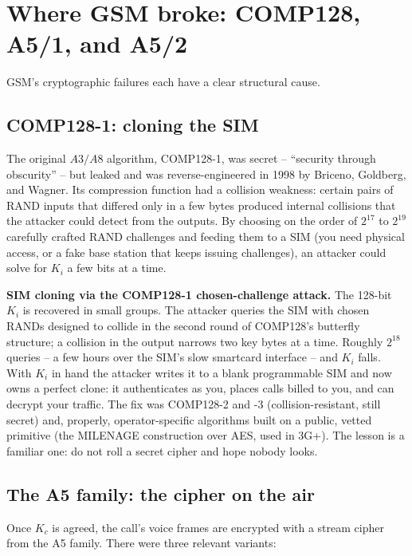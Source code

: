 \section{Where GSM broke: COMP128, A5/1, and A5/2}
\label{ch29:gsm-breaks}

GSM's cryptographic failures each have a clear structural cause.

\subsection{COMP128-1: cloning the SIM}
\label{ch29:comp128}

The original $A3/A8$ algorithm, COMP128-1, was secret -- ``security through obscurity'' -- but leaked and was reverse-engineered in 1998 by Briceno, Goldberg, and Wagner. Its compression function had a collision weakness: certain pairs of RAND inputs that differed only in a few bytes produced internal collisions that the attacker could detect from the outputs. By choosing on the order of $2^{17}$ to $2^{19}$ carefully crafted RAND challenges and feeding them to a SIM (you need physical access, or a fake base station that keeps issuing challenges), an attacker could solve for $K_i$ a few bits at a time.

\begin{attackbox}
\textbf{SIM cloning via the COMP128-1 chosen-challenge attack.} The 128-bit $K_i$ is recovered in small groups. The attacker queries the SIM with chosen RANDs designed to collide in the second round of COMP128's butterfly structure; a collision in the output narrows two key bytes at a time. Roughly $2^{18}$ queries -- a few hours over the SIM's slow smartcard interface -- and $K_i$ falls. With $K_i$ in hand the attacker writes it to a blank programmable SIM and now owns a perfect clone: it authenticates as you, places calls billed to you, and can decrypt your traffic. The fix was COMP128-2 and -3 (collision-resistant, still secret) and, properly, operator-specific algorithms built on a public, vetted primitive (the MILENAGE construction over AES, used in 3G+). The lesson is a familiar one: do not roll a secret cipher and hope nobody looks.
\end{attackbox}

\subsection{The A5 family: the cipher on the air}
\label{ch29:a5}

Once $K_c$ is agreed, the call's voice frames are encrypted with a stream cipher from the A5 family. There were three relevant variants:

